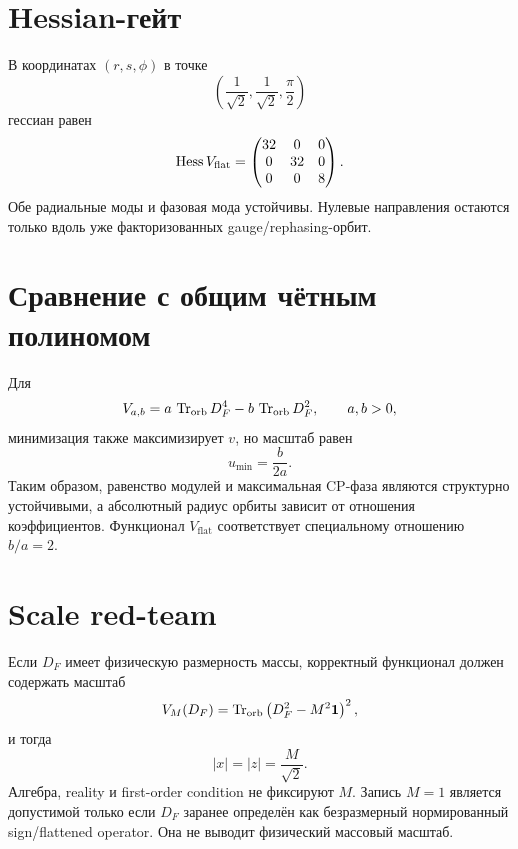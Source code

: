 \section{Hessian-гейт}

В координатах \((r,s,\phi)\) в точке
\begin{equation}
 \left(\frac1{\sqrt2},\frac1{\sqrt2},\frac{\pi}{2}\right)
\end{equation}
гессиан равен
\begin{equation}
 \operatorname{Hess} V_{\mathrm{flat}}
 =
 \begin{pmatrix}
 32&0&0\\
 0&32&0\\
 0&0&8
 \end{pmatrix}.
\end{equation}
Обе радиальные моды и фазовая мода устойчивы. Нулевые направления остаются
только вдоль уже факторизованных gauge/rephasing-орбит.

\section{Сравнение с общим чётным полиномом}

Для
\begin{equation}
 V_{a,b}
 =a\,\operatorname{Tr}_{\mathrm{orb}}D_F^4
 -b\,\operatorname{Tr}_{\mathrm{orb}}D_F^2,
 \qquad a,b>0,
\end{equation}
минимизация также максимизирует \(v\), но масштаб равен
\begin{equation}
 u_{\min}=\frac{b}{2a}.
\end{equation}
Таким образом, равенство модулей и максимальная CP-фаза являются
структурно устойчивыми, а абсолютный радиус орбиты зависит от отношения
коэффициентов. Функционал \(V_{\mathrm{flat}}\) соответствует специальному
отношению \(b/a=2\).

\section{Scale red-team}

Если \(D_F\) имеет физическую размерность массы, корректный функционал
должен содержать масштаб
\begin{equation}
 V_M(D_F)
 =\operatorname{Tr}_{\mathrm{orb}}\left(D_F^2-M^2\mathbf1\right)^2,
\end{equation}
и тогда
\begin{equation}
 |x|=|z|=\frac{M}{\sqrt2}.
\end{equation}
Алгебра, reality и first-order condition не фиксируют \(M\). Запись
\(M=1\) является допустимой только если \(D_F\) заранее определён как
безразмерный нормированный sign/flattened operator. Она не выводит
физический массовый масштаб.

